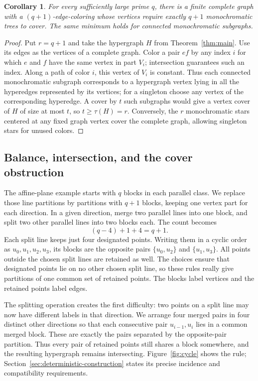 \documentclass[11pt]{article}
\newtheorem{corollary}[theorem]{Corollary}
\theoremstyle{definition}
\theoremstyle{remark}
\begin{document}
\begin{corollary}\label{cor:tree-cover}
For every sufficiently large prime $q$, there is a finite complete
graph with a $(q+1)$-edge-coloring whose vertices require exactly
$q+1$ monochromatic trees to cover. The same minimum holds for
connected monochromatic subgraphs.
\end{corollary}
\begin{proof}
Put $r=q+1$ and take the hypergraph $H$ from Theorem~\ref{thm:main}.
Use its edges as the vertices of a complete graph. Color a pair
$ef$ by any index $i$ for which $e$ and $f$ have the same vertex in
part $V_i$; intersection guarantees such an index. Along a path of
color $i$, this vertex of $V_i$ is constant. Thus each connected
monochromatic subgraph corresponds to a hypergraph vertex lying in all
the hyperedges represented by its vertices; for a singleton choose any
vertex of the corresponding hyperedge.
A cover by $t$ such subgraphs would give a vertex cover of $H$ of
size at most $t$, so $t\ge\tau(H)=r$. Conversely, the $r$
monochromatic stars centered at any fixed graph vertex cover the
complete graph, allowing singleton stars for unused colors.
\end{proof}

\subsection{Balance, intersection, and the cover obstruction}

The affine-plane example starts with $q$ blocks in each parallel class.
We replace those line partitions by partitions with $q+1$ blocks, keeping
one vertex part for each direction. In a given direction, merge two
parallel lines into one block, and split two other parallel lines into
two blocks each. The count becomes
\[
 (q-4)+1+4=q+1.
\]
Each split line keeps just four designated points. Writing them in a
cyclic order as $u_0,u_1,u_2,u_3$, its blocks are the opposite pairs
$\{u_0,u_2\}$ and $\{u_1,u_3\}$. All points outside the chosen split
lines are retained as well. The choices ensure that designated points
lie on no other chosen split line, so these rules really give partitions
of one common set of retained points. The blocks label vertices and the
retained points label edges.

The splitting operation creates the first difficulty: two points on a
split line may now have different labels in that direction. We arrange
four merged pairs in four distinct other directions so that each
consecutive pair $u_{i-1},u_i$ lies in a common merged block. These are
exactly the pairs separated by the opposite-pair partition. Thus every
pair of retained points still shares a block somewhere, and the resulting
hypergraph remains intersecting. Figure~\ref{fig:cycle} shows the rule;
Section~\ref{sec:deterministic-construction} states its precise incidence
and compatibility requirements.
\end{document}
